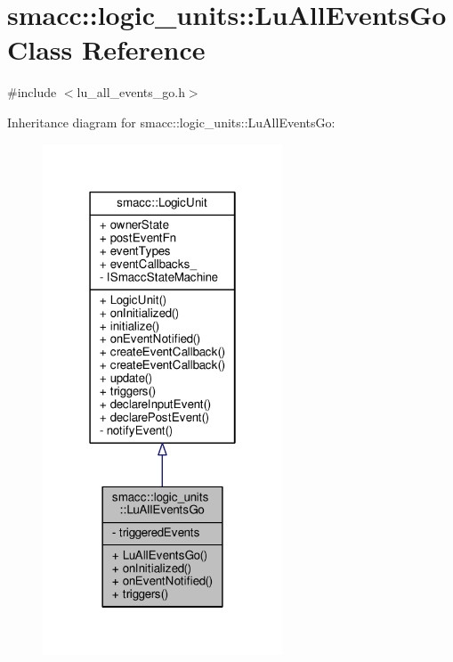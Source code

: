 \hypertarget{classsmacc_1_1logic__units_1_1LuAllEventsGo}{}\section{smacc\+:\+:logic\+\_\+units\+:\+:Lu\+All\+Events\+Go Class Reference}
\label{classsmacc_1_1logic__units_1_1LuAllEventsGo}


{\ttfamily \#include $<$lu\+\_\+all\+\_\+events\+\_\+go.\+h$>$}



Inheritance diagram for smacc\+:\+:logic\+\_\+units\+:\+:Lu\+All\+Events\+Go\+:\nopagebreak
\begin{figure}[H]
\begin{center}
\leavevmode
\includegraphics[width=202pt]{classsmacc_1_1logic__units_1_1LuAllEventsGo__inherit__graph}
\end{center}
\end{figure}


